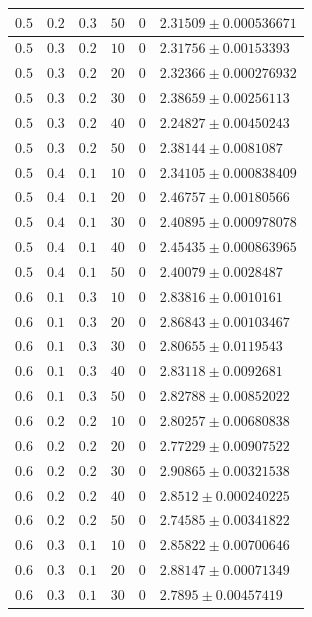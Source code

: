 \documentclass[14pt]{extreport}
\begin{document}
\begin{center}
\begin{longtable}{|p{1cm}|p{1cm}|p{1cm}|p{1cm}|p{1cm}|p{8cm}|}
$0.5$ & $0.2$ & $0.3$ & $50$ & $0$ & $2.31509 \pm 0.000536671$ \\ \hline
$0.5$ & $0.3$ & $0.2$ & $10$ & $0$ & $2.31756 \pm 0.00153393$ \\ \hline
$0.5$ & $0.3$ & $0.2$ & $20$ & $0$ & $2.32366 \pm 0.000276932$ \\ \hline
$0.5$ & $0.3$ & $0.2$ & $30$ & $0$ & $2.38659 \pm 0.00256113$ \\ \hline
$0.5$ & $0.3$ & $0.2$ & $40$ & $0$ & $2.24827 \pm 0.00450243$ \\ \hline
$0.5$ & $0.3$ & $0.2$ & $50$ & $0$ & $2.38144 \pm 0.0081087$ \\ \hline
$0.5$ & $0.4$ & $0.1$ & $10$ & $0$ & $2.34105 \pm 0.000838409$ \\ \hline
$0.5$ & $0.4$ & $0.1$ & $20$ & $0$ & $2.46757 \pm 0.00180566$ \\ \hline
$0.5$ & $0.4$ & $0.1$ & $30$ & $0$ & $2.40895 \pm 0.000978078$ \\ \hline
$0.5$ & $0.4$ & $0.1$ & $40$ & $0$ & $2.45435 \pm 0.000863965$ \\ \hline
$0.5$ & $0.4$ & $0.1$ & $50$ & $0$ & $2.40079 \pm 0.0028487$ \\ \hline
$0.6$ & $0.1$ & $0.3$ & $10$ & $0$ & $2.83816 \pm 0.0010161$ \\ \hline
$0.6$ & $0.1$ & $0.3$ & $20$ & $0$ & $2.86843 \pm 0.00103467$ \\ \hline
$0.6$ & $0.1$ & $0.3$ & $30$ & $0$ & $2.80655 \pm 0.0119543$ \\ \hline
$0.6$ & $0.1$ & $0.3$ & $40$ & $0$ & $2.83118 \pm 0.0092681$ \\ \hline
$0.6$ & $0.1$ & $0.3$ & $50$ & $0$ & $2.82788 \pm 0.00852022$ \\ \hline
$0.6$ & $0.2$ & $0.2$ & $10$ & $0$ & $2.80257 \pm 0.00680838$ \\ \hline
$0.6$ & $0.2$ & $0.2$ & $20$ & $0$ & $2.77229 \pm 0.00907522$ \\ \hline
$0.6$ & $0.2$ & $0.2$ & $30$ & $0$ & $2.90865 \pm 0.00321538$ \\ \hline
$0.6$ & $0.2$ & $0.2$ & $40$ & $0$ & $2.8512 \pm 0.000240225$ \\ \hline
$0.6$ & $0.2$ & $0.2$ & $50$ & $0$ & $2.74585 \pm 0.00341822$ \\ \hline
$0.6$ & $0.3$ & $0.1$ & $10$ & $0$ & $2.85822 \pm 0.00700646$ \\ \hline
$0.6$ & $0.3$ & $0.1$ & $20$ & $0$ & $2.88147 \pm 0.00071349$ \\ \hline
$0.6$ & $0.3$ & $0.1$ & $30$ & $0$ & $2.7895 \pm 0.00457419$ \\ \hline

\end{longtable}
\end{center}
\end{document}
